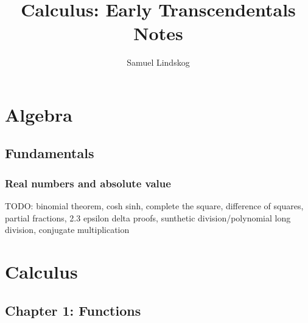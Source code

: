 \documentclass[oneside]{book}
\begin{document}
\title{Calculus: Early Transcendentals Notes}
\author{Samuel Lindskog}

\frontmatter

\maketitle
\tableofcontents

\mainmatter

\chapter{Algebra}
\section{Fundamentals}
\subsection{Real numbers and absolute value}
\begin{remark}
	TODO: binomial theorem, cosh sinh, complete the square, difference of squares, partial fractions, 2.3 epsilon delta proofs, sunthetic division/polynomial long division, conjugate multiplication
\end{remark}

\chapter{Calculus}
\section{Chapter 1: Functions}
\end{document}
